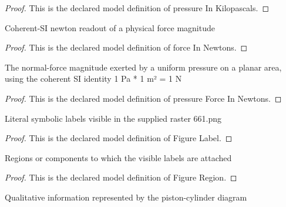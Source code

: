 \begin{proof}
  This is the declared model definition of pressure In Kilopascals.
\end{proof}
\begin{definition}
  \label{def:physics:phyx-mini-0661:phyxminiproblems-problemphyxmini0661-forceinnewtons}
  Coherent-SI newton readout of a physical force magnitude
\end{definition}
\begin{proof}
  This is the declared model definition of force In Newtons.
\end{proof}
\begin{definition}
  \label{def:physics:phyx-mini-0661:phyxminiproblems-problemphyxmini0661-pressureforceinnewtons}
  The normal-force magnitude exerted by a uniform pressure on a planar area, using the coherent SI identity 1 Pa * 1 m² = 1 N
\end{definition}
\begin{proof}
  This is the declared model definition of pressure Force In Newtons.
\end{proof}
\begin{definition}
  \label{def:physics:phyx-mini-0661:phyxminiproblems-problemphyxmini0661-figurelabel}
  Literal symbolic labels visible in the supplied raster 661.png
\end{definition}
\begin{proof}
  This is the declared model definition of Figure Label.
\end{proof}
\begin{definition}
  \label{def:physics:phyx-mini-0661:phyxminiproblems-problemphyxmini0661-figureregion}
  Regions or components to which the visible labels are attached
\end{definition}
\begin{proof}
  This is the declared model definition of Figure Region.
\end{proof}
\begin{definition}
  \label{def:physics:phyx-mini-0661:phyxminiproblems-problemphyxmini0661-valvefigure}
  Qualitative information represented by the piston-cylinder diagram
\end{definition}
